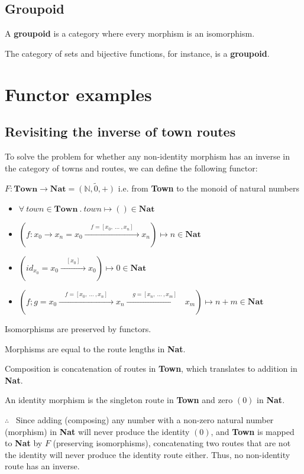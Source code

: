 \documentclass[../main.tex]{subfiles}
\begin{document}
\subsection{Groupoid}
A \textbf{groupoid} is a category where every morphism is an isomorphism.

The category of sets and bijective functions, for instance, is a \textbf{groupoid}.

\section{Functor examples}

\subsection{Revisiting the inverse of town routes}

To solve the problem for whether any non-identity morphism has an inverse in the category of towns and routes, we can define the following functor:\par

$F : \textbf{Town} \rightarrow \textbf{Nat} = \widetilde{(\mathbb{N},0,+)}$ \qquad i.e. from \textbf{Town} to the monoid of natural numbers
\begin{itemize}
  \item $\forall ~town \in \textbf{Town} ~.~ town \mapsto () \in \textbf{Nat}$
  \item $(f : x_0 \rightarrow x_n = x_0 \xrightarrow{\quad f = [x_0,~\dots~,x_n] \quad} x_n) \mapsto n \in \textbf{Nat}$
  \item $(id_{x_0} = x_0 \xrightarrow{\quad [x_0] \quad} x_0) \mapsto 0 \in \textbf{Nat}$
  \item $(f ; g = x_0 \xrightarrow{\quad f = [x_0,~\dots~,x_n] \quad} x_n  \xrightarrow{\quad g = [x_n,~\dots~,x_m] \quad} x_m) \mapsto n + m \in \textbf{Nat}$
\end{itemize}
Isomorphisms are preserved by functors.\par
Morphisms are equal to the route lengths in \textbf{Nat}. \par
Composition is concatenation of routes in \textbf{Town}, which translates to addition in \textbf{Nat}.\par
An identity morphism is the singleton route in \textbf{Town} and zero $(0)$ in \textbf{Nat}.\par
$\therefore$~ Since adding (composing) any number with a non-zero natural number (morphism) in \textbf{Nat} will never produce the identity $(0)$, and \textbf{Town} is mapped to \textbf{Nat} by $F$ (preserving isomorphisms), concatenating two routes that are not the identity will never produce the identity route either. Thus, no non-identity route has an inverse.
\end{document}
